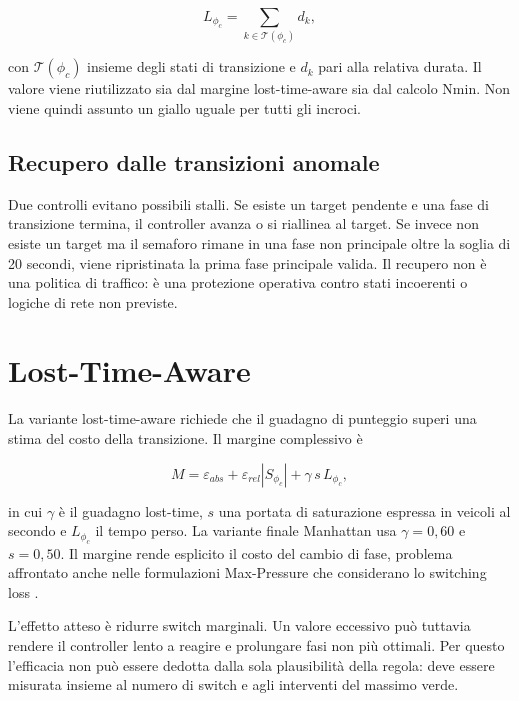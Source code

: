 \documentclass[12pt,a4paper,oneside]{report}
\numberwithin{equation}{chapter}
\begin{document}
\begin{equation}
    L_{\phi_c}=\sum_{k\in\mathcal{T}(\phi_c)}d_k,
    \label{eq:lost-time}
\end{equation}

con $\mathcal{T}(\phi_c)$ insieme degli stati di transizione e $d_k$ pari alla
relativa durata. Il valore viene riutilizzato sia dal margine lost-time-aware sia dal
calcolo Nmin. Non viene quindi assunto un giallo uguale per tutti gli incroci.

\subsection{Recupero dalle transizioni anomale}

Due controlli evitano possibili stalli. Se esiste un target pendente e una fase di
transizione termina, il controller avanza o si riallinea al target. Se invece
non esiste un target ma il semaforo rimane in una fase non principale oltre la
soglia di 20 secondi, viene ripristinata la prima fase principale valida. Il
recupero non è una politica di traffico: è una protezione operativa contro
stati incoerenti o logiche di rete non previste.

\section{Lost-Time-Aware}

La variante lost-time-aware richiede che il guadagno di punteggio superi una
stima del costo della transizione. Il margine complessivo è

\begin{equation}
    M=\varepsilon_{abs}+\varepsilon_{rel}|S_{\phi_c}|
      +\gamma\,s\,L_{\phi_c},
    \label{eq:lta-margin}
\end{equation}

in cui $\gamma$ è il guadagno lost-time, $s$ una portata di saturazione
espressa in veicoli al secondo e $L_{\phi_c}$ il tempo perso. La variante finale
Manhattan usa $\gamma=0{,}60$ e $s=0{,}50$. Il margine rende esplicito il costo
del cambio di fase, problema affrontato anche nelle formulazioni Max-Pressure
che considerano lo switching loss \cite{wang2022switching}.

L'effetto atteso è ridurre switch marginali. Un valore eccessivo può tuttavia
rendere il controller lento a reagire e prolungare fasi non più ottimali. Per
questo l'efficacia non può essere dedotta dalla sola plausibilità della regola:
deve essere misurata insieme al numero di switch e agli interventi del massimo
verde.
\end{document}
